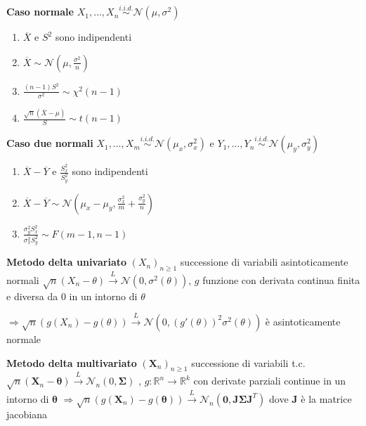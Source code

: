 \documentclass[openany]{book} %
\begin{document}
\textbf{Caso normale} $X_1,\dots,X_n \overset{i.i.d.}{\sim}\mathcal{N}(\mu,\sigma^2)$

\begin{enumerate}

	\item $\overline {X}$ e $S^2$ sono indipendenti

	\item $\overline{X}\sim \mathcal{N}(\mu,\frac{\sigma^2}{n})$

	\item $\frac{(n-1)S^2}{\sigma^2}\sim\chi^2(n-1)$

	\item $\frac{\sqrt{n}(\overline{X}-\mu)}{S}\sim t(n-1)$

\end{enumerate}

\textbf{Caso due normali} $X_1,\dots,X_m \overset{i.i.d.}{\sim}\mathcal{N}(\mu_x,\sigma_x^2)$ e $Y_1,\dots,Y_n \overset{i.i.d.}{\sim}\mathcal{N}(\mu_y,\sigma^2_y)$

\begin{enumerate}

	\item $\overline{X}-\overline{Y}$ e $\frac{S_x^2}{S_y^2}$ sono indipendenti

	\item $\overline{X}-\overline{Y}\sim \mathcal{N}(\mu_x-\mu_y,\frac{\sigma_x^2}{m}+\frac{\sigma_y^2}{n})$

	\item $\frac{\sigma_y^2S_x^2}{\sigma_x^2S_y^2}\sim F(m-1,n-1)$

\end{enumerate}

\textbf{Metodo delta univariato} $(X_n)_{n\geq 1}$ successione di variabili asintoticamente normali $\sqrt{n}(X_n-\theta)\overset{L}{\rightarrow}\mathcal{N}(0,\sigma^2(\theta))$, $g$ funzione con derivata continua finita e diversa da 0 in un intorno di $\theta$

$\Rightarrow \sqrt {n}(g(X_n)-g(\theta))\overset{L}{\rightarrow}\mathcal{N}(0,(g'(\theta))^2\sigma^2(\theta))$ è asintoticamente normale

\textbf{Metodo delta multivariato} $(\boldsymbol{X}_n)_{n\geq 1}$ successione di variabili t.c. $\sqrt{n}(\boldsymbol{X}_n-\boldsymbol{\theta})\overset{L}{\rightarrow}\mathcal{N}_n(0,\boldsymbol{\Sigma})$ , $g:\mathbb{R}^n \rightarrow \mathbb{R}^k$ con derivate parziali continue in un intorno di $\boldsymbol{\theta}$ $\Rightarrow \sqrt {n}(g(\boldsymbol{X}_n)-g(\boldsymbol{\theta}))\overset{L}{\rightarrow}\mathcal{N}_n(\boldsymbol{0},\boldsymbol{J\Sigma J}^T)$ dove $\boldsymbol{J}$ è la matrice jacobiana
\end{document}
